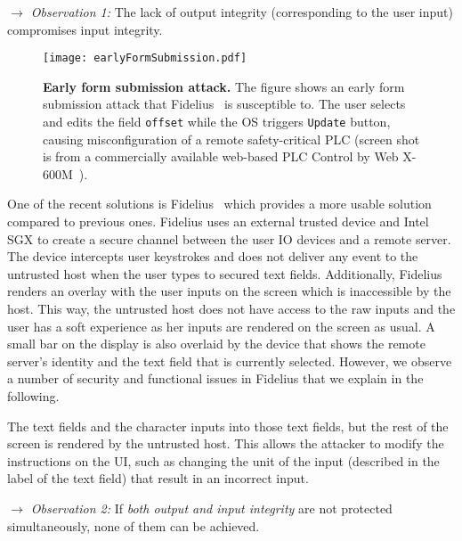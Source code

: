 \noindent\emph{$\rightarrow$ Observation 1:} The lack of output integrity (corresponding to the user input) compromises input integrity.

\begin{figure}[t]
\centering
\texttt{[image: earlyFormSubmission.pdf]} 
\caption{\textbf{Early form submission attack.} The figure shows an early form submission attack that Fidelius~\cite{Fidelius} is susceptible to. The user selects and edits the field \texttt{offset} while the OS triggers \texttt{Update} button, causing misconfiguration of a remote safety-critical PLC (screen shot is from a commercially available web-based PLC Control by Web X-600M~\cite{controlbyweb}).}
\spacesave
\label{fig:clickJack}
\centering 
\end{figure}


One of the recent solutions is Fidelius~\cite{Fidelius} which provides a more usable solution compared to previous ones. Fidelius uses an external trusted device and Intel SGX to create a secure channel between the user IO devices and a remote server. The device intercepts user keystrokes and does not deliver any event to the untrusted host when the user types to secured text fields. Additionally, Fidelius renders an overlay with the user inputs on the screen which is inaccessible by the host. This way, the untrusted host does not have access to the raw inputs and the user has a soft experience as her inputs are rendered on the screen as usual.
A small bar on the display is also overlaid by the device that shows the remote server's identity and the text field that is currently selected. 
However, we observe a number of security and functional issues in Fidelius that we explain in the following.

The text fields and the character inputs into those text fields, but the rest of the screen is rendered by the untrusted host.
This allows the attacker to modify the instructions on the UI, such as changing the unit of the input (described in the label of the text field) that result in an incorrect input.

 \noindent\emph{$\rightarrow$ Observation 2:} If \emph{both output and input integrity} are not protected simultaneously, none of them can be achieved. 

